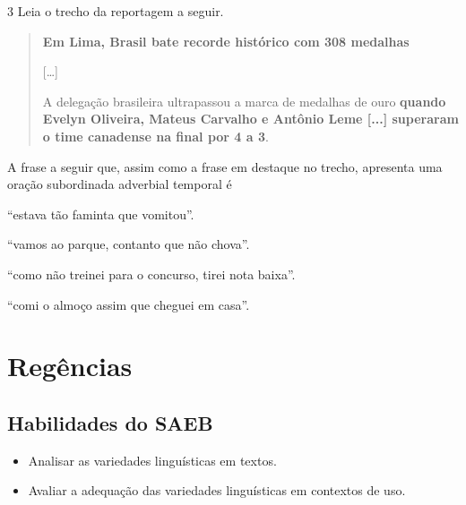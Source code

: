 \num{3} Leia o trecho da reportagem a seguir.

\begin{quote}
\textbf{Em Lima, Brasil bate recorde histórico com 308 medalhas}


{[}\ldots{}{]}

A delegação brasileira ultrapassou a marca de medalhas de ouro
\textbf{quando Evelyn Oliveira, Mateus Carvalho e Antônio Leme {[}...{]}
superaram o time canadense na final por 4 a 3}.

\end{quote}

A frase a seguir que, assim como a frase em destaque no trecho,
apresenta uma oração subordinada adverbial temporal é

\begin{escolha}
\item ``estava tão faminta que vomitou''.

\item ``vamos ao parque, contanto que não chova''.

\item ``como não treinei para o concurso, tirei nota baixa''.

\item ``comi o almoço assim que cheguei em casa''.
\end{escolha}

\chapter{Regências}

\section{Habilidades do SAEB}

\begin{itemize}
\item Analisar as variedades linguísticas em textos.

\item Avaliar a adequação das variedades linguísticas em contextos de uso.
\end{itemize}

